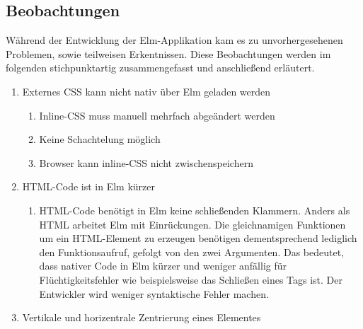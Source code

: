 \subsection{Beobachtungen}
\label{sec:Beobachtungen}
Während der Entwicklung der Elm-Applikation kam es zu unvorhergesehenen Problemen, sowie teilweisen Erkentnissen. Diese Beobachtungen werden im folgenden stichpunktartig zusammengefasst und anschließend erläutert.
\begin{enumerate}[label*=\arabic*.]

\item Externes \ac{CSS} kann nicht nativ über Elm geladen werden
	\begin{enumerate}[label*=\arabic*.]
		\item Inline-\ac{CSS} muss manuell mehrfach abgeändert werden
		\item Keine Schachtelung möglich
		\item Browser kann inline-\ac{CSS} nicht zwischenspeichern
	\end{enumerate}
\item HTML-Code ist in Elm kürzer
	\begin{enumerate}[label*=\arabic*.]
		\item \ac{HTML}-Code benötigt in Elm keine schließenden Klammern. Anders als \ac{HTML} arbeitet Elm mit Einrückungen. Die gleichnamigen Funktionen um ein \ac{HTML}-Element zu erzeugen benötigen dementsprechend lediglich den Funktionsaufruf, gefolgt von den zwei Argumenten. Das bedeutet, dass nativer Code in Elm kürzer und weniger anfällig für Flüchtigkeitsfehler wie beispielsweise das Schließen eines Tags ist. Der Entwickler wird weniger syntaktische Fehler machen.
	\end{enumerate}
\item Vertikale und horizentrale Zentrierung eines Elementes
	\begin{enumerate}[label*=\arabic*.]

\end{enumerate}
\end{enumerate}
